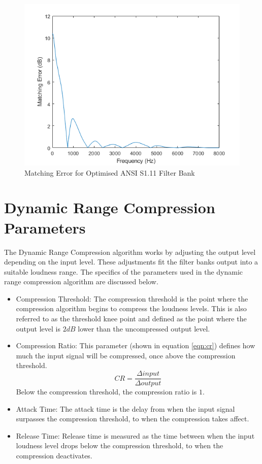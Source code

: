 \documentclass[11pt,onecolumn]{witseiepaper}
\begin{document}
\begin{appendices}
\begin{figure}[h]
\centering
\includegraphics[width=0.6\linewidth]{ansiOptMatErr.PNG}
\caption{Matching Error for Optimised ANSI S1.11 Filter Bank}
\label{fig:ansiOptMatErr}
\end{figure} 

\section{Dynamic Range Compression Parameters}
\label{app:compressPara}

\noindent The Dynamic Range Compression algorithm works by adjusting the output level depending on the input level. These adjustments fit the filter banks output into a suitable loudness range. The specifics of the parameters used in the dynamic range compression algorithm are discussed below.

\begin{itemize}
	\item Compression Threshold: The compression threshold is the point where the compression algorithm begins to compress the loudness levels. This is also referred to as the threshold knee point and defined as the point where the output level is $2dB$ lower than the uncompressed output level.
	\item Compression Ratio: This parameter (shown in equation \ref{eqn:cr}) defines how much the input signal will be compressed, once above the compression threshold. 
	\begin{equation}
	\label{eqn:cr}
		CR = \frac{\Delta input}{\Delta output}
	\end{equation}
	\noindent Below the compression threshold, the compression ratio is $1$.
	\item Attack Time: The attack time is the delay from when the input signal surpasses the compression threshold, to when the compression takes affect.
	\item Release Time: Release time is measured as the time between when the input loudness level drops below the compression threshold, to when the compression deactivates.
\end{itemize}


\end{appendices}
\end{document}
